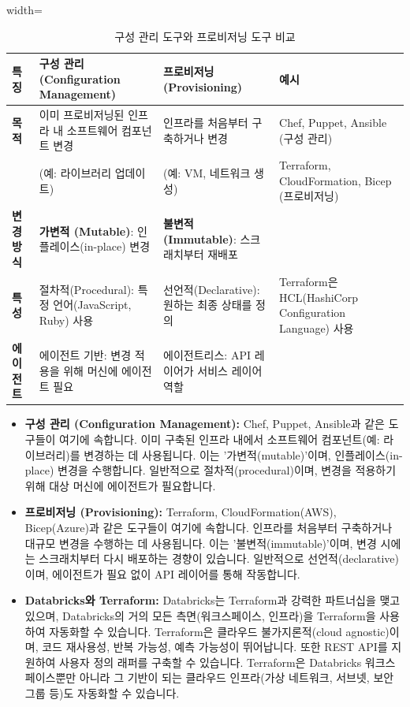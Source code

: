 \documentclass[11pt,a4paper]{article}
\theoremstyle{definition}
\begin{document}
\begin{table}[h!]
\centering
\caption{구성 관리 도구와 프로비저닝 도구 비교}
\label{tab:iac_tools_comparison}
\begin{adjustbox}{width=\textwidth}
\begin{tabular}{llll}
\toprule
\textbf{특징} & \textbf{구성 관리 (Configuration Management)} & \textbf{프로비저닝 (Provisioning)} & \textbf{예시} \\
\midrule
\textbf{목적} & 이미 프로비저닝된 인프라 내 소프트웨어 컴포넌트 변경 & 인프라를 처음부터 구축하거나 변경 & Chef, Puppet, Ansible (구성 관리) \\
& (예: 라이브러리 업데이트) & (예: VM, 네트워크 생성) & Terraform, CloudFormation, Bicep (프로비저닝) \\
\textbf{변경 방식} & \textbf{가변적 (Mutable)}: 인플레이스(in-place) 변경 & \textbf{불변적 (Immutable)}: 스크래치부터 재배포 & \\
\textbf{특성} & 절차적(Procedural): 특정 언어(JavaScript, Ruby) 사용 & 선언적(Declarative): 원하는 최종 상태를 정의 & Terraform은 HCL(HashiCorp Configuration Language) 사용 \\
\textbf{에이전트} & 에이전트 기반: 변경 적용을 위해 머신에 에이전트 필요 & 에이전트리스: API 레이어가 서비스 레이어 역할 & \\
\bottomrule
\end{tabular}
\end{adjustbox}
\end{table}

\begin{itemize}
    \item \textbf{구성 관리 (Configuration Management):}
    Chef, Puppet, Ansible과 같은 도구들이 여기에 속합니다. 이미 구축된 인프라 내에서 소프트웨어 컴포넌트(예: 라이브러리)를 변경하는 데 사용됩니다. 이는 '가변적(mutable)'이며, 인플레이스(in-place) 변경을 수행합니다. 일반적으로 절차적(procedural)이며, 변경을 적용하기 위해 대상 머신에 에이전트가 필요합니다.

    \item \textbf{프로비저닝 (Provisioning):}
    Terraform, CloudFormation(AWS), Bicep(Azure)과 같은 도구들이 여기에 속합니다. 인프라를 처음부터 구축하거나 대규모 변경을 수행하는 데 사용됩니다. 이는 '불변적(immutable)'이며, 변경 시에는 스크래치부터 다시 배포하는 경향이 있습니다. 일반적으로 선언적(declarative)이며, 에이전트가 필요 없이 API 레이어를 통해 작동합니다.

    \item \textbf{Databricks와 Terraform:}
    Databricks는 Terraform과 강력한 파트너십을 맺고 있으며, Databricks의 거의 모든 측면(워크스페이스, 인프라)을 Terraform을 사용하여 자동화할 수 있습니다. Terraform은 클라우드 불가지론적(cloud agnostic)이며, 코드 재사용성, 반복 가능성, 예측 가능성이 뛰어납니다. 또한 REST API를 지원하여 사용자 정의 래퍼를 구축할 수 있습니다. Terraform은 Databricks 워크스페이스뿐만 아니라 그 기반이 되는 클라우드 인프라(가상 네트워크, 서브넷, 보안 그룹 등)도 자동화할 수 있습니다.
\end{itemize}
\end{document}
